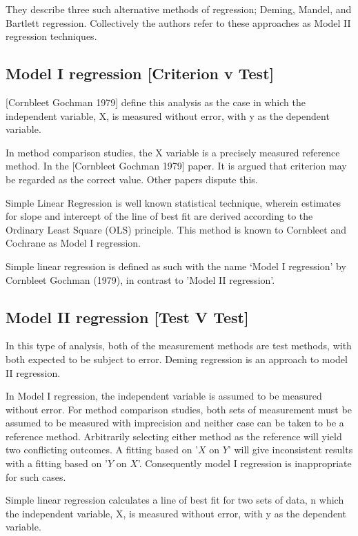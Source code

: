 \documentclass[12pt, a4paper]{report}
\theoremstyle{plain}
\theoremstyle{definition}
\theoremstyle{remark}
\begin{document}
They describe three such alternative methods of regression; Deming, Mandel, and Bartlett regression. Collectively the authors refer to these approaches as Model II regression techniques.

\subsection{Model I regression [Criterion v Test]}
[Cornbleet Gochman 1979] define this analysis as the case in which the independent variable, X, is measured without error, with y as the dependent variable.
 
In method comparison studies, the X variable is a precisely measured reference method. In the [Cornbleet Gochman 1979] paper. It is argued that criterion may be regarded as the correct value. Other papers dispute this.
 

Simple Linear Regression is well known statistical technique, wherein estimates for slope and
intercept of the line of best fit are derived according to the Ordinary Least Square (OLS) principle. This method is known to Cornbleet and Cochrane as Model I regression.

Simple linear regression is defined as such with the name `Model I regression' by Cornbleet Gochman (1979), in contrast to 'Model II regression'.

 
\subsection{Model II regression [Test V Test]}
In this type of analysis, both of the measurement methods are test methods, with both expected to be subject to error. Deming regression is an approach to model II regression.



In Model I regression, the independent variable is assumed to be
measured without error. For method comparison studies, both sets of measurement must be assumed to be measured with imprecision and neither case can be taken to be a reference method. Arbitrarily
selecting either method as the reference will yield two conflicting outcomes. A fitting based on '$X$ on $Y$' will give inconsistent results with a fitting based on '$Y$ on $X$'. Consequently model I regression is inappropriate for such cases.



 
Simple linear regression calculates a line of best fit for two
sets of data, n which the independent variable, X, is measured without error, with y as the dependent variable.  
\end{document}
